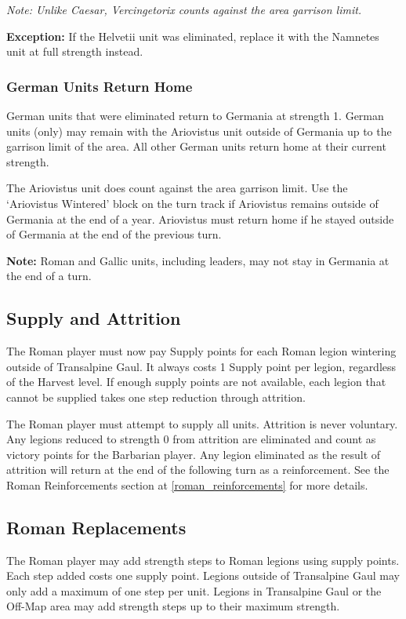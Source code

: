 \textit{Note: Unlike Caesar, Vercingetorix counts against the area garrison limit.}

\textbf{Exception:} If the Helvetii unit was eliminated, replace it with the Namnetes unit at full strength instead.

\subsubsection{German Units Return Home}
\label{german_units_return_home}
\par
German units that were eliminated return to Germania at strength 1. German units (only) may remain with the Ariovistus unit outside of Germania up to the garrison limit of the area. All other German units return home at their current strength.

The Ariovistus unit does count against the area garrison limit. Use the ‘Ariovistus Wintered’ block on the turn track if Ariovistus remains outside of Germania at the end of a year. Ariovistus must return home if he stayed outside of Germania at the end of the previous turn.

\textbf{Note:} Roman and Gallic units, including leaders, may not stay in Germania at the end of a turn.

\subsection{Supply and Attrition}
\label{supply_and_attrition}
\par
The Roman player must now pay Supply points for each Roman legion wintering outside of Transalpine Gaul. It always costs 1 Supply point per legion, regardless of the Harvest level. If enough supply points are not available, each legion that cannot be supplied takes one step reduction through attrition.

The Roman player must attempt to supply all units. Attrition is never voluntary. Any legions reduced to strength 0 from attrition are eliminated and count as victory points for the Barbarian player. Any legion eliminated as the result of attrition will return at the end of the following turn as a reinforcement. See the Roman Reinforcements section at \ref{roman_reinforcements} for more details.

\subsection{Roman Replacements}
\par
The Roman player may add strength steps to Roman legions using supply points. Each step added costs one supply point. Legions outside of Transalpine Gaul may only add a maximum of one step per unit. Legions in Transalpine Gaul or the Off-Map area may add strength steps up to their maximum strength. 

